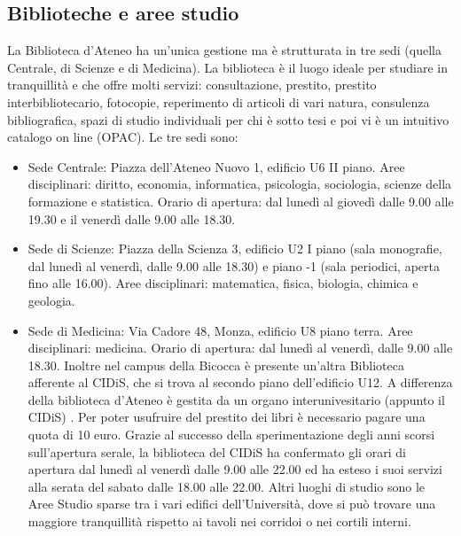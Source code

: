 \subsection{Biblioteche e aree studio}
La Biblioteca d'Ateneo ha un'unica gestione ma è strutturata in tre sedi (quella Centrale, di Scienze e di Medicina). La biblioteca è il luogo ideale per studiare in tranquillità e che offre molti servizi: consultazione, prestito, prestito interbibliotecario, fotocopie, reperimento di articoli di vari natura, consulenza bibliografica, spazi di studio individuali per chi è sotto tesi e poi vi è un intuitivo catalogo on line (OPAC).
Le tre sedi sono:
\begin{itemize}
\item Sede Centrale: Piazza dell'Ateneo Nuovo 1, edificio U6 II piano. Aree disciplinari: diritto, economia, informatica, psicologia, sociologia, scienze della formazione e statistica. Orario di apertura: dal lunedì al giovedì dalle 9.00 alle 19.30 e il venerdì dalle 9.00 alle 18.30.
\item Sede di Scienze: Piazza della Scienza 3, edificio U2 I piano (sala monografie, dal lunedì al venerdì, dalle 9.00 alle 18.30) e piano -1 (sala periodici, aperta fino alle 16.00). Aree disciplinari: matematica, fisica, biologia, chimica e geologia.
\item Sede di Medicina: Via Cadore 48, Monza, edificio U8 piano terra. Aree disciplinari: medicina. Orario di apertura: dal lunedì al venerdì, dalle 9.00 alle 18.30.
Inoltre nel campus della Bicocca è presente un'altra Biblioteca afferente al CIDiS, che si trova al secondo piano dell'edificio U12. A differenza della biblioteca d'Ateneo è gestita da un organo interunivesitario (appunto il CIDiS) . Per poter usufruire del prestito dei libri è necessario pagare una quota di 10 euro. Grazie al successo della sperimentazione degli anni scorsi sull'apertura serale, la biblioteca del CIDiS ha confermato gli orari di apertura dal lunedì al venerdì dalle 9.00 alle 22.00 ed ha esteso i suoi servizi alla serata del sabato dalle 18.00 alle 22.00.
Altri luoghi di studio sono le Aree Studio sparse tra i vari edifici dell'Università, dove si può trovare una maggiore tranquillità rispetto ai tavoli nei corridoi o nei cortili interni.


\end{itemize}
